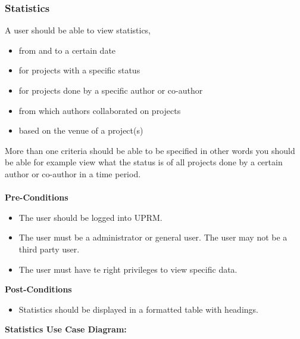 \subsubsection{Statistics}
A user should be able to view statistics,
\begin{itemize}
	\item from and to a certain date
	\item for projects with a specific status
	\item for projects done by a specific author or co-author
	\item from which authors collaborated on projects
	\item based on the venue of a project(s)\\
\end{itemize}
More than one criteria should be able to be specified in other words you should be able for example view what the status is of all projects done by a certain author or co-author in a time period.\\ \\
\textbf{Pre-Conditions}
\begin{itemize}
	\item The user should be logged into UPRM.
	\item The user must be a administrator or general user. The user may not be a third party user.
	\item The user must have te right privileges to view specific data.\\
\end{itemize}
\textbf{Post-Conditions}
\begin{itemize}
	\item Statistics should be displayed in a formatted table with headings.\\
\end{itemize}
\textbf{Statistics Use Case Diagram:}\\
\centerline{}
